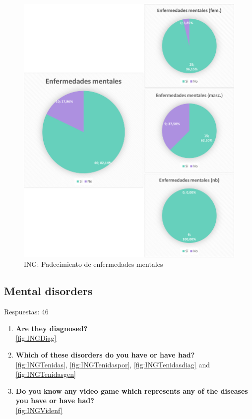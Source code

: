 \documentclass[12pt, a4paper,twoside,titlepage]{book}
\begin{document}
\begin{figure}
    \centering
    \includegraphics[width=1\linewidth]{ANEXO ING/19AnexINGEnf}
    \caption{ING: Padecimiento de enfermedades mentales}
    \label{fig:INGEnfer}
\end{figure}


\subsection{Mental disorders}
Respuestas: 46
\begin{enumerate}[label=\textbf{\arabic*}.]
     \item \textbf{Are they diagnosed?}\\
     \ref{fig:INGDiag}
     \item \textbf{Which of these disorders do you have or have had? }\\
     \ref{fig:INGTenidas}, \ref{fig:INGTenidaspor}, \ref{fig:INGTenidasdiag} and \ref{fig:INGTenidasgen}
     \item \textbf{Do you know any video game which represents any of the diseases you have or have had?}\\
     \ref{fig:INGVidenf}
\end{enumerate}
\end{document}
